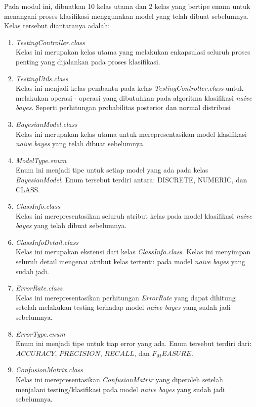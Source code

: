Pada modul ini, dibuatkan 10 kelas utama dan 2 kelas yang bertipe emum untuk menangani proses klasifikasi menggunakan model yang telah dibuat sebelumnya. Kelas tersebut diantaranya adalah: 
\begin{enumerate}
\item{\textit{TestingController.class}} \\
Kelas ini merupakan kelas utama yang melakukan enkapsulasi seluruh proses penting yang dijalankan pada proses klasifikasi.
\item{\textit{TestingUtils.class}} \\
Kelas ini menjadi kelas-pembantu pada kelas \textit{TestingController.class} untuk melakukan operasi - operasi yang dibutuhkan pada algoritma klasifikasi \textit{naive bayes}. Seperti perhitungan probabilitas posterior dan normal distribusi
\item{\textit{BayesianModel.class}} \\
Kelas ini merupakan kelas utama untuk merepresentasikan model klasifikasi \textit{naive bayes} yang telah dibuat sebelumnya.
\item{\textit{ModelType.enum}} \\
Enum ini menjadi tipe untuk setiap model yang ada pada kelas \textit{BayesianModel}. Enum tersebut terdiri antara: DISCRETE, NUMERIC, dan CLASS.
\item{\textit{ClassInfo.class}} \\
Kelas ini merepresentasikan seluruh atribut kelas pada model klasifikasi \textit{naive bayes} yang telah dibuat sebelumnya.
\item{\textit{ClassInfoDetail.class}} \\
Kelas ini merupakan ekstensi dari kelas \textit{ClassInfo.class}. Kelas ini menyimpan seluruh detail mengenai atribut kelas tertentu pada model \textit{naive bayes} yang sudah jadi.
\item{\textit{ErrorRate.class}} \\
Kelas ini merepresentasikan perhitungan \textit{ErrorRate} yang dapat dihitung setelah melakukan testing terhadap model \textit{naive bayes} yang sudah jadi sebelumnya.
\item{\textit{ErrorType.enum}} \\
Enum ini menjadi tipe untuk tiap error yang ada. Enum tersebut terdiri dari: $ACCURACY$, $PRECISION$, $RECALL$, dan $F_MEASURE$.
\item{\textit{ConfusionMatrix.class}} \\
Kelas ini merepresentasikan \textit{ConfusionMatrix} yang diperoleh setelah menjalani testing/klasifikasi pada model \textit{naive bayes} yang sudah jadi sebelumnya.

\end{enumerate}
